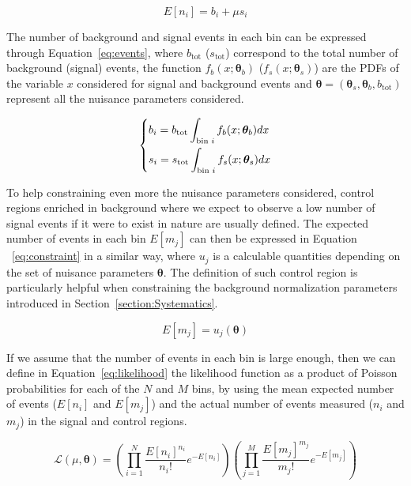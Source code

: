 \documentclass[a4paper, 10pt, openright]{report}
\begin{document}
\begin{equation}
\label{eq:count}
E[n_i] = b_i + \mu s_i
\end{equation}

The number of background and signal events in each bin can be expressed through Equation~\ref{eq:events}, where $b_{\text{tot}}$ ($s_{\text{tot}}$) correspond to the total number of background (signal) events, the function $f_b(x;\bm \theta_b)$ ($f_s(x;\bm \theta_s)$) are the \acp{PDF} of the variable $x$ considered for signal and background events and $\bm \theta = (\bm \theta_s, \bm \theta_b, b_\text{tot})$ represent all the nuisance parameters considered.

\begin{equation}
\label{eq:events}
\begin{dcases}
b_i = b_{\text{tot}} \int_{\text{bin }i} f_b(x;\bm \theta_b)dx \\
s_i = s_{\text{tot}} \int_{\text{bin }i} f_s(x;\bm \theta_s)dx
\end{dcases}
\end{equation}

To help constraining even more the nuisance parameters considered, control regions enriched in background where we expect to observe a low number of signal events if it were to exist in nature are usually defined. The expected number of events in each bin $E[m_j]$ can then be expressed in Equation ~\ref{eq:constraint} in a similar way, where $u_j$ is a calculable quantities depending on the set of nuisance parameters $\bm \theta$. The definition of such control region is particularly helpful when constraining the background normalization parameters introduced in Section~\ref{section:Systematics}.

\begin{equation}
\label{eq:constraint}
E[m_j] = u_j(\bm \theta)
\end{equation}

If we assume that the number of events in each bin is large enough, then we can define in Equation~\ref{eq:likelihood} the likelihood function as a product of Poisson probabilities for each of the $N$ and $M$ bins, by using the mean expected number of events ($E[n_i]$ and $E[m_j]$) and the actual number of events measured ($n_i$ and $m_j$) in the signal and control regions.

\begin{equation}
\label{eq:likelihood}
\mathcal{L}(\mu, \bm \theta) = \left (\prod_{i = 1}^N \frac{E[n_i]^{n_i}}{n_i!} e^{-E[n_i]} \right) \left (\prod_{j=1}^M \frac{E[m_j]^{m_j}}{m_j!} e^{-E[m_j]} \right)
\end{equation}
\end{document}
